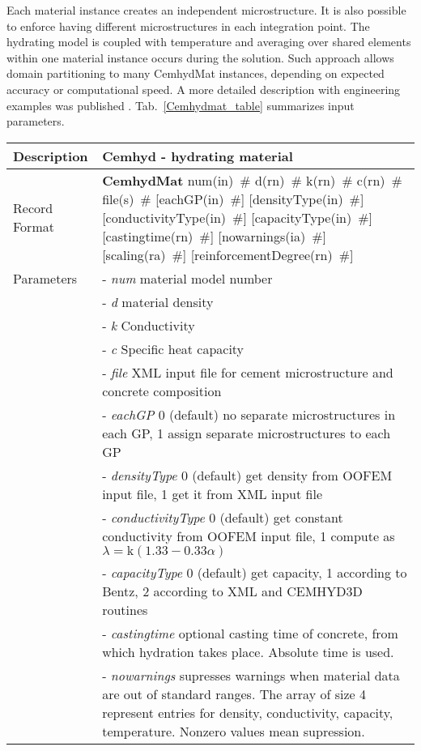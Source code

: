 \documentclass[a4paper]{article}
\newcommand{\descitem}[1]{{\noindent \bf #1}}
\newcommand{\elemparam}[2]{{{#1\tiny (#2)}~\#}}
\newcommand{\param}[1]{{\it #1}}
\newenvironment{mmt}{\begin{tabular}{|l|p{9cm}|}}{\end{tabular}\\}
\newenvironment{mmt}{\begin{tabular}{|l|l|}}{\end{tabular}\\}
\begin{document}
Each material instance creates an independent microstructure. It is also
possible to enforce having different microstructures in each integration point.
The hydrating model is coupled with temperature and averaging over shared
elements within one material instance occurs during the solution. Such approach
allows domain partitioning to many CemhydMat instances, depending on expected
accuracy or computational speed. A more detailed description with engineering
examples was published \cite{Smilauer:09}. Tab.~\ref{Cemhydmat_table} summarizes input parameters.

\begin{table}[!htb]
\begin{mmt}
\hline
Description & Cemhyd - hydrating material\\
\hline
Record Format & \descitem{CemhydMat} \elemparam{num}{in} \elemparam{d}{rn} \elemparam{k}{rn} \elemparam{c}{rn} \elemparam{file}{s} [\elemparam{eachGP}{in}] [\elemparam{densityType}{in}] [\elemparam{conductivityType}{in}] [\elemparam{capacityType}{in}] [\elemparam{castingtime}{rn}] [\elemparam{nowarnings}{ia}] [\elemparam{scaling}{ra}] [\elemparam{reinforcementDegree}{rn}]\\
Parameters &- \param{num} material model number\\
&- \param{d} material density\\
&- \param{k} Conductivity\\
&- \param{c} Specific heat capacity\\
&- \param{file} XML input file for cement microstructure and concrete composition\\
&- \param{eachGP} 0 (default) no separate microstructures in each GP, 1 assign separate microstructures to each GP\\
&- \param{densityType} 0 (default) get density from OOFEM input file, 1 get it from XML input file\\
&- \param{conductivityType} 0 (default) get constant conductivity from OOFEM input file, 1 compute as $\lambda = \textrm{k} (1.33-0.33\alpha)$ \cite{Ruiz:01}\\
&- \param{capacityType} 0 (default) get capacity, 1 according to Bentz, 2 according to XML and CEMHYD3D routines\\
&- \param{castingtime} optional casting time of concrete, from which hydration takes place. Absolute time is used.\\
&- \param{nowarnings} supresses warnings when material data are out of standard ranges. The array of size 4 represent entries for density, conductivity, capacity, temperature. Nonzero values mean supression.\\

\end{mmt}
\end{table}
\end{document}
